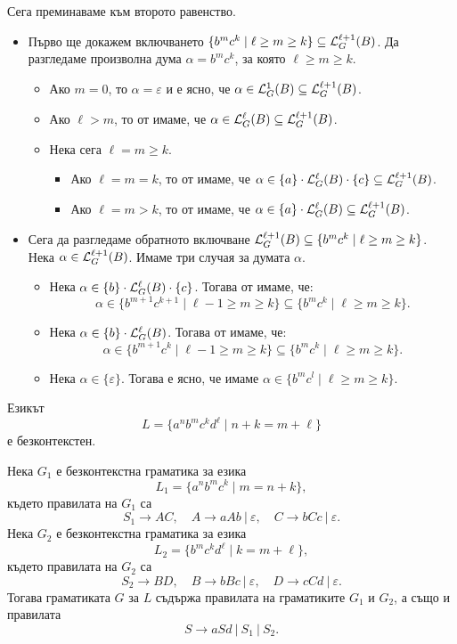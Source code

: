 {\begin{example}
  Сега преминаваме към второто равенство.
  \begin{itemize}
  \item
    Първо ще докажем включването $\{b^mc^k \mid \ell \geq m \geq k\} \subseteq \mathcal{L}^{\ell+1}_G(B)$.
    Да разгледаме произволна дума $\alpha = b^mc^k$, за която $\ell \geq m \geq k$.
    \begin{itemize}
    \item
      Ако $m = 0$, то $\alpha = \varepsilon$ и е ясно, че $\alpha \in \mathcal{L}^{1}_G(B) \subseteq \mathcal{L}^{\ell+1}_G(B)$.
    \item
      Ако $\ell > m$, то от \IndHyp имаме, че $\alpha \in \mathcal{L}^{\ell}_G(B) \subseteq \mathcal{L}^{\ell+1}_G(B)$.
    \item
      Нека сега $\ell = m \geq k$.
      \begin{itemize}
      \item
        Ако $\ell = m = k$, то от \IndHyp имаме, че $\alpha \in \{a\} \cdot \mathcal{L}^\ell_G(B) \cdot \{c\} \subseteq \mathcal{L}^{\ell+1}_G(B)$.
      \item
        Ако $\ell = m > k$, то от \IndHyp имаме, че $\alpha \in \{a\} \cdot \mathcal{L}^\ell_G(B) \subseteq \mathcal{L}^{\ell+1}_G(B)$.
      \end{itemize}
    \end{itemize}
  \item
    Сега да разгледаме обратното включване $\mathcal{L}^{\ell+1}_G(B) \subseteq \{b^mc^k \mid \ell \geq m \geq k\}$.
    Нека $\alpha \in \mathcal{L}^{\ell+1}_G(B)$. Имаме три случая за думата $\alpha$.
    \begin{itemize}
    \item
      Нека $\alpha \in \{b\} \cdot \mathcal{L}^\ell_G(B) \cdot \{c\}$. Тогава от \IndHyp имаме, че:
      \[\alpha \in \{b^{m+1}c^{k+1} \mid \ell-1\geq m \geq k\} \subseteq \{b^mc^k \mid \ell \geq m \geq k\}.\]
    \item
      Нека $\alpha \in \{b\} \cdot \mathcal{L}^\ell_G(B)$. Тогава от \IndHyp имаме, че:
      \[\alpha \in \{b^{m+1}c^{k} \mid \ell-1\geq m \geq k\} \subseteq \{b^mc^k \mid \ell \geq m \geq k\}.\]
    \item
      Нека $\alpha \in \{\varepsilon\}$. Тогава е ясно, че имаме $\alpha \in \{b^mc^l \mid \ell \geq m \geq k\}$.
    \end{itemize}
  \end{itemize}
\end{example}
}

\newpage
\begin{example}
  Езикът 
  \[L = \{a^nb^mc^kd^\ell \mid n+k = m + \ell\}\]
  е безконтекстен.
\end{example}
\begin{hint}
  Нека $G_1$ е безконтекстна граматика за езика
  \[L_1 = \{a^nb^mc^k \mid m = n+k\},\]
  където правилата на $G_1$ са
  \[S_1 \to AC,\quad  A \to aAb\ |\ \varepsilon,\quad C \to bCc\ |\ \varepsilon.\]
  Нека $G_2$ е безконтекстна граматика за езика 
  \[L_2 = \{b^mc^kd^\ell \mid k = m+\ell\},\]
  където правилата на $G_2$ са
  \[S_2 \to BD,\quad B \to bBc\ |\ \varepsilon,\quad D \to cCd\ |\ \varepsilon.\]
  Тогава граматиката $G$ за $L$ 
  съдържа правилата на граматиките $G_1$ и $G_2$, а също и правилата
  \[S \to aSd\ |\ S_1\ |\ S_2.\]
\end{hint}

